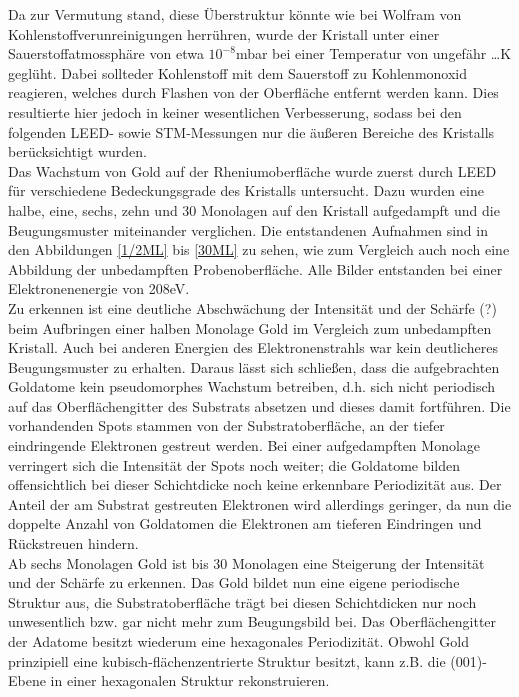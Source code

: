 Da zur Vermutung stand, diese Überstruktur könnte wie bei Wolfram von Kohlenstoffverunreinigungen
herrühren, wurde der Kristall unter einer Sauerstoffatmossphäre von etwa $10^{-8}$mbar bei einer
Temperatur von ungefähr \ldots K geglüht. Dabei sollteder Kohlenstoff mit dem Sauerstoff zu
Kohlenmonoxid reagieren, welches durch Flashen von der Oberfläche entfernt werden kann. Dies
resultierte hier jedoch in keiner wesentlichen Verbesserung, sodass bei den folgenden LEED- sowie
STM-Messungen nur die äußeren Bereiche des Kristalls berücksichtigt wurden.\\
Das Wachstum von Gold auf der Rheniumoberfläche wurde zuerst durch LEED für
verschiedene Bedeckungsgrade des Kristalls untersucht. Dazu wurden eine halbe, eine, sechs, zehn und
30 Monolagen auf den Kristall aufgedampft und die Beugungsmuster miteinander verglichen. Die
entstandenen Aufnahmen sind in den Abbildungen \ref{1/2ML} bis \ref{30ML} zu sehen, wie zum
Vergleich auch noch eine Abbildung der unbedampften Probenoberfläche. Alle Bilder entstanden
bei einer Elektronenenergie von 208eV.\\
Zu erkennen ist eine deutliche Abschwächung der Intensität und der Schärfe (?) beim Aufbringen einer
halben Monolage Gold im Vergleich zum unbedampften Kristall. Auch bei anderen Energien des
Elektronenstrahls war kein deutlicheres Beugungsmuster zu erhalten. Daraus lässt sich schließen,
dass die aufgebrachten Goldatome kein pseudomorphes Wachstum betreiben, d.h. sich nicht periodisch
auf das Oberflächengitter des Substrats absetzen und dieses damit fortführen. Die vorhandenden Spots
stammen von der Substratoberfläche, an der tiefer eindringende Elektronen gestreut werden. Bei einer
aufgedampften Monolage verringert sich die Intensität der Spots noch weiter; die Goldatome bilden
offensichtlich bei dieser Schichtdicke noch keine erkennbare Periodizität aus. Der Anteil der am
Substrat gestreuten Elektronen wird allerdings geringer, da nun die doppelte Anzahl von Goldatomen
die Elektronen am tieferen Eindringen und Rückstreuen hindern.\\
Ab sechs Monolagen Gold ist bis 30 Monolagen eine Steigerung der Intensität und der Schärfe zu
erkennen. Das Gold bildet nun eine eigene periodische Struktur aus, die Substratoberfläche trägt
bei diesen Schichtdicken nur noch unwesentlich bzw. gar nicht mehr zum Beugungsbild bei. Das
Oberflächengitter der Adatome besitzt wiederum eine hexagonales Periodizität. Obwohl Gold
prinzipiell eine kubisch-flächenzentrierte Struktur besitzt, kann z.B. die (001)-Ebene in einer
hexagonalen Struktur rekonstruieren.\\
